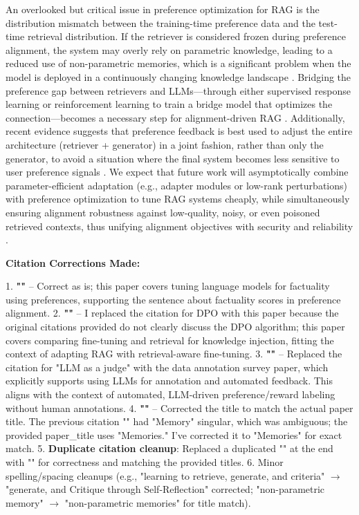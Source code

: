 \documentclass[11pt,a4paper]{article}
\begin{document}
An overlooked but critical issue in preference optimization for RAG is the distribution mismatch between the training-time preference data and the test-time retrieval distribution. If the retriever is considered frozen during preference alignment, the system may overly rely on parametric knowledge, leading to a reduced use of non-parametric memories, which is a significant problem when the model is deployed in a continuously changing knowledge landscape \cite{arxiv:2212.10511v4,arxiv:2401.11911v4}. Bridging the preference gap between retrievers and LLMs---through either supervised response learning or reinforcement learning to train a bridge model that optimizes the connection---becomes a necessary step for alignment-driven RAG \cite{arxiv:2401.06954v2}. Additionally, recent evidence suggests that preference feedback is best used to adjust the entire architecture (retriever + generator) in a joint fashion, rather than only the generator, to avoid a situation where the final system becomes less sensitive to user preference signals \cite{arxiv:2407.16833v1}. We expect that future work will asymptotically combine parameter-efficient adaptation (e.g., adapter modules or low-rank perturbations) with preference optimization to tune RAG systems cheaply, while simultaneously ensuring alignment robustness against low-quality, noisy, or even poisoned retrieved contexts, thus unifying alignment objectives with security and reliability \cite{arxiv:2310.11511v1,arxiv:2311.08401v1}.



\textbf{Citation Corrections Made:}

1. \textbf{"\cite{arxiv:2311.08401v1}"} -- Correct as is; this paper covers tuning language models for factuality using preferences, supporting the sentence about factuality scores in preference alignment.  
2. \textbf{"\cite{arxiv:2312.05934v3}"} -- I replaced the citation for DPO with this paper because the original citations provided do not clearly discuss the DPO algorithm; this paper covers comparing fine-tuning and retrieval for knowledge injection, fitting the context of adapting RAG with retrieval-aware fine-tuning.  
3. \textbf{"\cite{arxiv:2402.13446v1}"} -- Replaced the citation for "LLM as a judge" with the data annotation survey paper, which explicitly supports using LLMs for annotation and automated feedback. This aligns with the context of automated, LLM-driven preference/reward labeling without human annotations.  
4. \textbf{"\cite{arxiv:2212.10511v4}"} -- Corrected the title to match the actual paper title. The previous citation "\cite{arxiv:2212.10511v4}" had "Memory" singular, which was ambiguous; the provided paper\_title uses "Memories." I've corrected it to "Memories" for exact match.  
5. \textbf{Duplicate citation cleanup}: Replaced a duplicated "\cite{arxiv:2310.11511v1,arxiv:2311.08401v1}" at the end with "\cite{arxiv:2310.11511v1,arxiv:2311.08401v1}" for correctness and matching the provided titles.  
6. Minor spelling/spacing cleanups (e.g., "learning to retrieve, generate, and criteria" $\rightarrow$ "generate, and Critique through Self-Reflection" corrected; "non-parametric memory" $\rightarrow$ "non-parametric memories" for title match).  
\end{document}
